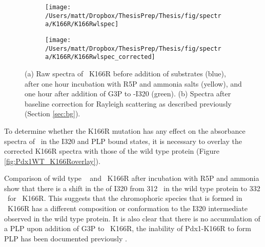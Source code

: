 \begin{figure}
\centering
\begin{subfigure}{.49\textwidth}
  \centering
  \texttt{[image: /Users/matt/Dropbox/ThesisPrep/Thesis/fig/spectra/K166R/K166Rwlspec]}	
	 
    \caption{\label{fig:K166Rwlspec}}
 
\end{subfigure}
\begin{subfigure}{.49\textwidth}
  \centering
  \texttt{[image: /Users/matt/Dropbox/ThesisPrep/Thesis/fig/spectra/K166R/K166Rwlspec\_corrected]}
 
  \caption{\label{fig:K166Rwlspec_corrected}}
 
\end{subfigure}

\caption[Spectra of \atpdx ~K166R in solution]{(a) Raw spectra of \atpdx ~K166R before addition of substrates (blue), after one hour incubation with R5P and ammonia salts (yellow), and one hour after addition of G3P to \atpdx -I320 (green). (b) Spectra after baseline correction for Rayleigh scattering as described previously (Section \ref{sec:bg}).\label{fig:Pdx1WT_K166Rspec}}
\end{figure}

To determine whether the K166R mutation has any effect on the absorbance spectra of \atpdx ~in the I320 and PLP bound states, it is necessary to overlay the corrected K166R spectra with those of the wild type protein (Figure \ref{fig:Pdx1WT_K166Roverlay}).

Comparison of wild type \atpdx ~ and \atpdx ~K166R after incubation with R5P and ammonia show that there is a shift in the \lwl of I320 from 312 \nm ~in the wild type protein to 332 \nm ~for \atpdx ~K166R. This suggests that the chromophoric species that is formed in \atpdx ~K166R has a different composition or conformation to the I320 intermediate observed in the wild type protein. It is also clear that there is no accumulation of a PLP upon addition of G3P to \atpdx ~K166R, the inability of Pdx1-K166R to form PLP has been documented previously \cite{Raschle2007}. 

